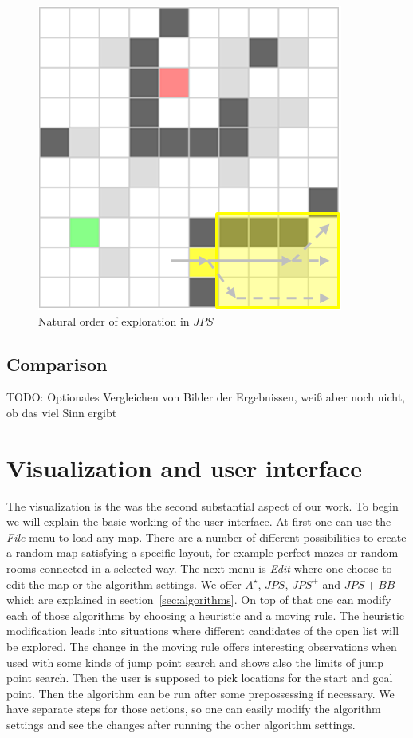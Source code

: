\documentclass{article}
\begin{document}
    \begin{figure}[!htb]
        \centering
        \includegraphics{figures/bounding_boxes.png}
        \caption{Natural order of exploration in $JPS$}
        \label{fig:bounding_boxes}
    \end{figure}
    
    
    
    \subsection{Comparison}
    
    TODO: Optionales Vergleichen von Bilder der Ergebnissen, weiß aber noch nicht, ob das viel Sinn ergibt
    
    
    
    \section{Visualization and user interface}
    
    The visualization is the was the second substantial aspect of our work. To begin we will explain the basic working of the user interface. At first one can use the \textit{File} menu to load any map. There are a number of different possibilities to create a random map satisfying a specific layout, for example perfect mazes or random rooms connected in a selected way. The next menu is \textit{Edit} where one choose to edit the map or the algorithm settings. We offer $A^\star$, $JPS$, $JPS^+$ and $JPS+BB$ which are explained in section~\ref{sec:algorithms}. On top of that one can modify each of those algorithms by choosing a heuristic and a moving rule. The heuristic modification leads into situations where different candidates of the open list will be explored. The change in the moving rule offers interesting observations when used with some kinds of jump point search and shows also the limits of jump point search. Then the user is supposed to pick locations for the start and goal point. Then the algorithm can be run after some prepossessing if necessary. We have separate steps for those actions, so one can easily modify the algorithm settings and see the changes after running the other algorithm settings.
    
\end{document}

